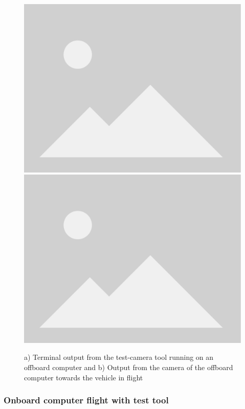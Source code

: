 \begin{figure}
  \centering
  \includegraphics[width=.45\textwidth, keepaspectratio]{img/placeholder.png}
  \includegraphics[width=.45\textwidth, keepaspectratio]{img/placeholder.png}
  \caption{a) Terminal output from the test-camera tool running on an offboard computer and b) Output from the camera of the offboard computer towards the vehicle in flight}\label{fig:flight-test-cam-offboard}
\end{figure}

\subsubsection{Onboard computer flight with test tool}

